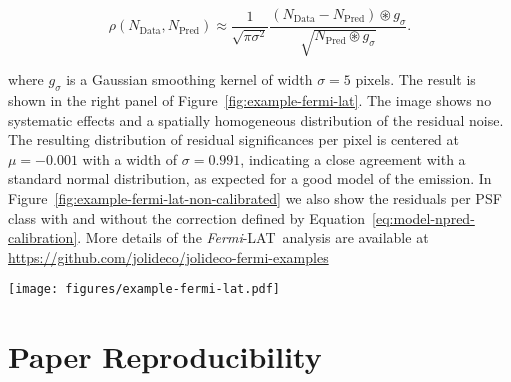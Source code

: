 \documentclass[twocolumn, lineno]{aastex631}
\newcommand{\fermi}{\textit{Fermi}-LAT~}
\newcommand{\jolideco}{\textit{Jolideco}~}
\begin{document}
    \begin{equation}
        \label{eq:approx-sigma}
        \rho(N_{\mathrm{Data}}, N_{\mathrm{Pred}}) \approx \frac{1}{\sqrt{\pi \sigma^2}}\frac{(N_{\mathrm{Data}} - N_{\mathrm{Pred}}) \circledast g_{\sigma}} {\sqrt{N_{\mathrm{Pred}}\circledast g_{\sigma}}}.
    \end{equation}
    
    where $g_{\sigma}$ is a Gaussian smoothing kernel of width $\sigma=5$ pixels. The result is shown in the right panel of Figure~\ref{fig:example-fermi-lat}. The image shows no systematic effects and a spatially homogeneous distribution of the residual noise. The resulting distribution of residual significances per pixel is centered at $\mu=-0.001$ with a width of $\sigma=0.991$, indicating a close agreement with a standard normal distribution, as expected for a good model of the emission. In Figure~\ref{fig:example-fermi-lat-non-calibrated} we also show the residuals per PSF class with and without the correction defined by Equation~\ref{eq:model-npred-calibration}. More details of the \fermi analysis are available at \url{https://github.com/jolideco/jolideco-fermi-examples}
    
      \begin{figure*}
        \begin{centering}
            \texttt{[image: figures/example-fermi-lat.pdf]}
            \caption{
                Illustration of the \jolideco result for the \fermi data of the supernova remnant \textit{RX J0852.0-4622} or \textit{Vela Junior}. The left image shows the counts above \qty[mode = text]{10}{GeV}. The different event classes are stacked into a single image with bin size $0.02$~degrees. The image in the center shows the flux reconstructed by the \jolideco method. The image on the right shows the standardized residuals as computed by Equation~\ref{eq:approx-sigma} and smoothed with a \textit{Gaussian} kernel of width 5~pixels $\approx 0.1$~degrees, similar to the size of the PSF.
                More information on this analysis example can be found on \url{https://github.com/jolideco/jolideco-fermi-examples}.
            }
            \label{fig:example-fermi-lat}
        \end{centering}
    \end{figure*}
    
    \section{Paper Reproducibility}
    \label{sec:reproducibility}
\end{document}
